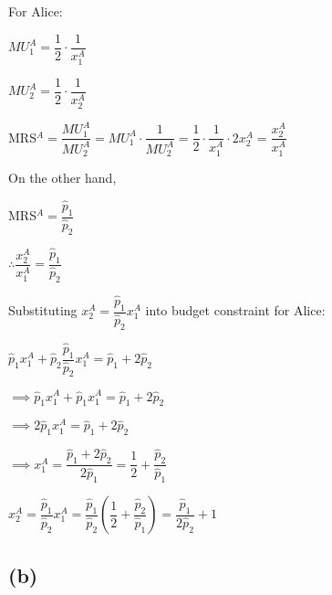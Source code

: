 \documentclass{article}
\begin{document}

For Alice:

$MU^{A}_{1}=\dfrac{1}{2}\cdot\dfrac{1}{x^{A}_{1}}$

$MU^{A}_{2}=\dfrac{1}{2}\cdot\dfrac{1}{x^{A}_{2}}$

MRS$^{A}=\dfrac{MU^{A}_{1}}{MU^{A}_{2}}=MU^{A}_{1}\cdot\dfrac{1}{MU^{A}_{2}}=\dfrac{1}{2}\cdot\dfrac{1}{x^{A}_{1}}\cdot2x^{A}_{2}=\dfrac{x^{A}_{2}}{x^{A}_{1}}$

On the other hand, 

MRS$^{A}=\dfrac{\hat{p}_{1}}{\hat{p}_{2}}$

$\therefore \dfrac{x^{A}_{2}}{x^{A}_{1}}=\dfrac{\hat{p}_{1}}{\hat{p}_{2}}$

Substituting $x^{A}_{2}=\dfrac{\hat{p}_{1}}{\hat{p}_{2}}x^{A}_{1}$ into budget constraint for Alice:

$\hat{p}_{1}x^{A}_{1}+\hat{p}_{2}\dfrac{\hat{p}_{1}}{\hat{p}_{2}}x^{A}_{1}=\hat{p}_{1}+2\hat{p}_{2}$

$\implies \hat{p}_{1}x^{A}_{1}+\hat{p}_{1}x^{A}_{1}=\hat{p}_{1}+2\hat{p}_{2}$

$\implies 2\hat{p}_{1}x^{A}_{1}=\hat{p}_{1}+2\hat{p}_{2}$

$\implies x^{A}_{1}=\dfrac{\hat{p}_{1}+2\hat{p}_{2}}{2\hat{p}_{1}}=\boxed{\dfrac{1}{2}+\dfrac{\hat{p}_{2}}{\hat{p}_{1}}}$

$x^{A}_{2}=\dfrac{\hat{p}_{1}}{\hat{p}_{2}}x^{A}_{1}=\dfrac{\hat{p}_{1}}{\hat{p}_{2}}\left(\dfrac{1}{2}+\dfrac{\hat{p}_{2}}{\hat{p}_{1}}\right)=\boxed{\dfrac{\hat{p}_{1}}{2\hat{p}_{2}}+1}$

\subsection*{(b)}

\end{document}
